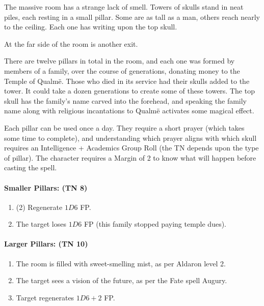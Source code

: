 \begin{multicols}{2}
\begin{boxtext}
  The massive room has a strange lack of smell.  Towers of skulls stand in neat piles, each resting in a small pillar.  Some are as tall as a man, others reach nearly to the ceiling.  Each one has writing upon the top skull.

  At the far side of the room is another exit.

\end{boxtext}

There are twelve pillars in total in the room, and each one was formed by members of a family, over the course of generations, donating money to the Temple of Qualm\"{e}.
Those who died in its service had their skulls added to the tower.
It could take a dozen generations to create some of these towers.
The top skull has the family's name carved into the forehead, and speaking the family name along with religious incantations to Qualm\"{e} activates some magical effect.

Each pillar can be used once a day.
They require a short prayer (which takes some time to complete), and understanding which prayer aligns with which skull requires an Intelligence + Academics Group Roll (the TN depends upon the type of pillar).
The character requires a Margin of 2 to know what will happen before casting the spell.

\paragraph{Smaller Pillars: (TN 8)}

\begin{enumerate}

  \item{(2) Regenerate $1D6$ FP.}
  \item{The target loses $1D6$ FP (this family stopped paying temple dues).}
\end{enumerate}

\paragraph{Larger Pillars: (TN 10)}

\begin{enumerate}

  \item{The room is filled with sweet-smelling mist, as per Aldaron level 2.}
  \item{The target sees a vision of the future, as per the Fate spell Augury.}
  \item{Target regenerates $1D6+2$ FP.}
\end{enumerate}


\end{multicols}

